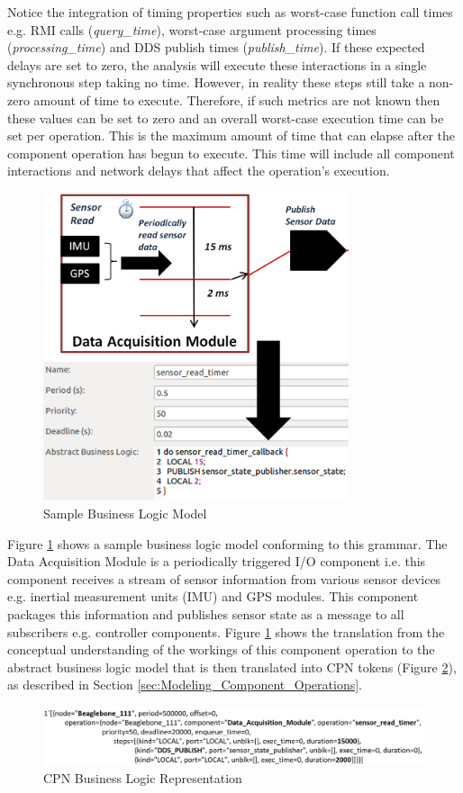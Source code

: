 Notice the integration of timing properties such as worst-case function call times e.g. RMI calls  (\emph{query\_time}), worst-case argument processing times (\emph{processing\_time}) and DDS publish times (\emph{publish\_time}). If these expected delays are set to zero, the analysis will execute these interactions in a single synchronous step taking no time. However, in reality these steps still take a non-zero amount of time to execute. Therefore, if such metrics are not known then these values can be set to zero and an overall worst-case execution time can be set per operation. This is the maximum amount of time that can elapse after the component operation has begun to execute. This time will include all component interactions and network delays that affect the operation's execution. 

\begin{figure}[ht]
	\centering
	\includegraphics[width=0.8\textwidth]{./img/abstract_business_logic}
	\caption{Sample Business Logic Model}
	\label{fig:sblm}
\end{figure}

Figure \ref{fig:sblm} shows a sample business logic model conforming to this grammar. The Data Acquisition Module is a periodically triggered I/O component i.e. this component receives a stream of sensor information from various sensor devices e.g. inertial measurement units (IMU) and GPS modules. This component packages this information and publishes sensor state as a message to all subscribers e.g. controller components. Figure \ref{fig:sblm} shows the translation from the conceptual understanding of the workings of this component operation to the abstract business logic model that is then translated into CPN tokens (Figure \ref{fig:blte}), as described in Section \ref{sec:Modeling_Component_Operations}. 

\begin{figure}[ht]
	\centering
	\includegraphics[width=\textwidth]{./img/cpn_business_logic_token_example}
	\caption{CPN Business Logic Representation}
	\label{fig:blte}
\end{figure}
